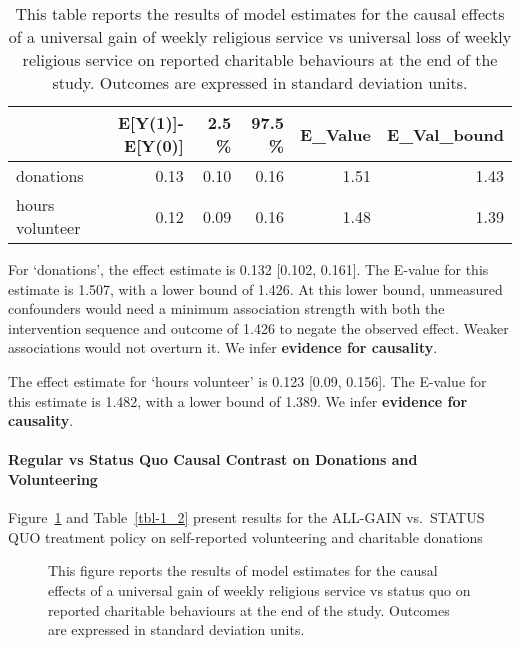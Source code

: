 \documentclass[
  single column]{article}
\let\oldparagraph\paragraph
\renewcommand{\paragraph}[1]{\oldparagraph{#1}\mbox{}}
\begin{document}
\begin{longtable}[]{@{}lrrrrr@{}}

\caption{\label{tbl-1_1}This table reports the results of model
estimates for the causal effects of a universal gain of weekly religious
service vs universal loss of weekly religious service on reported
charitable behaviours at the end of the study. Outcomes are expressed in
standard deviation units.}

\tabularnewline

\toprule\noalign{}
& E{[}Y(1){]}-E{[}Y(0){]} & 2.5 \% & 97.5 \% & E\_Value &
E\_Val\_bound \\
\midrule\noalign{}
\endhead
\bottomrule\noalign{}
\endlastfoot
donations & 0.13 & 0.10 & 0.16 & 1.51 & 1.43 \\
hours volunteer & 0.12 & 0.09 & 0.16 & 1.48 & 1.39 \\

\end{longtable}

For `donations', the effect estimate is 0.132 {[}0.102, 0.161{]}. The
E-value for this estimate is 1.507, with a lower bound of 1.426. At this
lower bound, unmeasured confounders would need a minimum association
strength with both the intervention sequence and outcome of 1.426 to
negate the observed effect. Weaker associations would not overturn it.
We infer \textbf{evidence for causality}.

The effect estimate for `hours volunteer' is 0.123 {[}0.09, 0.156{]}.
The E-value for this estimate is 1.482, with a lower bound of 1.389. We
infer \textbf{evidence for causality}.

\newpage{}

\paragraph{Regular vs Status Quo Causal Contrast on Donations and
Volunteering}\label{regular-vs-status-quo-causal-contrast-on-donations-and-volunteering}

Figure~\ref{fig-1_2} and Table~\ref{tbl-1_2} present results for the
ALL-GAIN vs.~STATUS QUO treatment policy on self-reported volunteering
and charitable donations

\begin{figure}


\caption{\label{fig-1_2}This figure reports the results of model
estimates for the causal effects of a universal gain of weekly religious
service vs status quo on reported charitable behaviours at the end of
the study. Outcomes are expressed in standard deviation units.}

\end{figure}%
\end{document}
